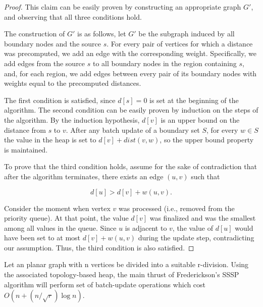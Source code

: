 \begin{proof}
This claim can be easily proven by constructing an appropriate graph $G'$, and observing that all three conditions hold.

The construction of $G'$ is as follows, let $G'$ be the subgraph induced by all boundary nodes and the source $s$. For every pair of vertices for which a distance was precomputed, we add an edge with the corresponding weight. Specifically, we add edges from the source $s$ to all boundary nodes in the region containing $s$, and, for each region, we add edges between every pair of its boundary nodes with weights equal to the precomputed distances.

The first condition is satisfied, since $d[s] = 0$ is set at the beginning of the algorithm. The second condition can be easily proven by induction on the steps of the algorithm. By the induction hypothesis, $d[v]$ is an upper bound on the distance from $s$ to $v$. After any batch update of a boundary set $S$, for every $w \in S$ the value in the heap is set to $d[v] + dist(v, w)$, so the upper bound property is maintained.

To prove that the third condition holds, assume for the sake of contradiction that after the algorithm terminates, there exists an edge $(u, v)$ such that

$$d[u] > d[v] + w(u,v).$$

Consider the moment when vertex $v$ was processed (i.e., removed from the priority queue). At that point, the value $d[v]$ was finalized and was the smallest among all values in the queue. Since $u$ is adjacent to $v$, the value of $d[u]$ would have been set to at most $d[v] + w(u, v)$ during the update step, contradicting our assumption. Thus, the third condition is also satisfied.

\end{proof}

\begin{theorem} 
Let an planar graph with n vertices be divided into a suitable r-division. Using the associated topology-based heap, the main thrust of Frederickson's SSSP algorithm will perform set of batch-update operations which cost $O(n + (n/\sqrt{r})\log n)$.
\end{theorem}

